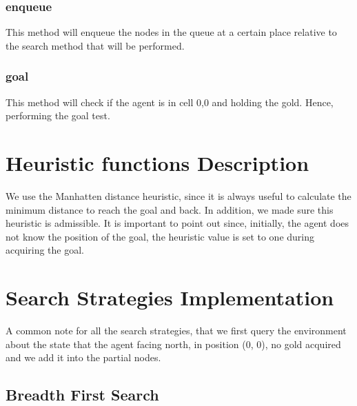 		\subsubsection*{enqueue}
		This method will enqueue the nodes in the queue at a certain place relative to the search method that will be performed. 
		
		
		\subsubsection*{goal}
		This method will check if the agent is in cell 0,0 and holding the gold. Hence, performing the goal test.
	
\section{Heuristic functions Description}	

We use the Manhatten distance heuristic, since it is always useful to calculate the minimum distance to reach the goal and back. In addition, we made sure this heuristic is admissible. It is important to point out since, initially, the agent does not know the position of the goal, the heuristic value is set to one during acquiring the goal.


\section{Search Strategies Implementation}

A common note for all the search strategies, that we first query the environment about the state that the agent facing north, in position (0, 0), no gold acquired and we add it into the partial nodes.

\subsection{Breadth First Search}

